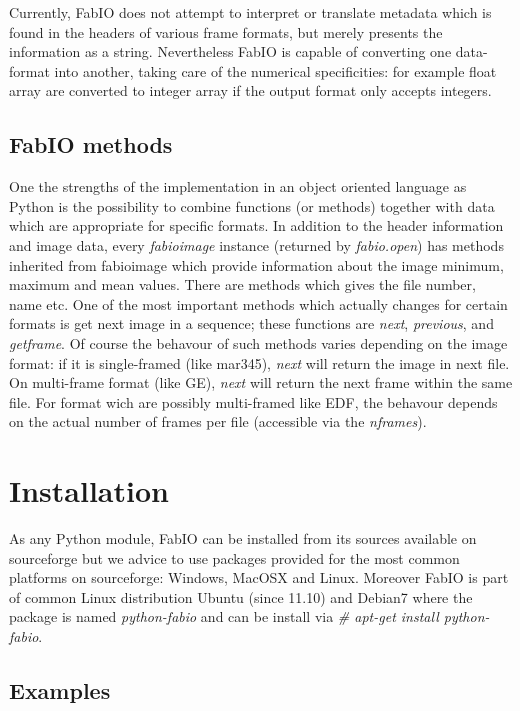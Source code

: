 \documentclass{iucr}
\begin{document}
Currently, FabIO does not attempt to interpret or translate metadata which
is found in the headers of various frame formats, but merely presents the
information as a string. Nevertheless FabIO is capable of converting one
data-format into another, taking care of the numerical specificities: 
for example float array are converted to integer array if the output format only
accepts integers.


\subsection{FabIO methods}

One the strengths of the implementation in an object oriented language as Python
is the possibility to combine functions (or methods) together with data which
are appropriate for specific formats.
In addition to the header information and image data, every {\em fabioimage}
instance (returned by {\em fabio.open}) has methods inherited from fabioimage 
which provide information about the image minimum, maximum and mean values.
There are methods which gives the file number, name etc. One of the most
important methods which actually changes for certain formats  is get next image
in a sequence; these functions are {\em next}, {\em previous}, and {\em
getframe}. Of course the behavour of such methods varies depending on the
image format: if it is single-framed (like mar345),  {\em next} will
return the image in next file. On multi-frame format (like GE), {\em next} will return the
next frame within the same file. For format wich are possibly multi-framed like
EDF, the behavour depends on the actual number of frames per file (accessible
via the {\em nframes}).


\section{Installation}

As any Python module, FabIO can be installed from its sources available on sourceforge\cite{fabio}
but we advice to use packages provided for the most common
platforms on sourceforge: Windows, MacOSX and Linux. Moreover FabIO is part of
common Linux distribution Ubuntu (since 11.10) and Debian7 where the package is named
{\em python-fabio} and can be install via {\em # apt-get install python-fabio}.

\subsection{Examples}
\end{document}
